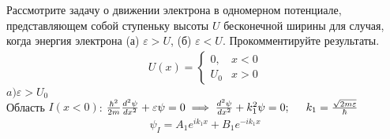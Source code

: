 \documentclass[__main__.tex]{subfiles}
\begin{document}
Рассмотрите задачу о движении электрона в одномерном потенциале, представляющем собой ступеньку высоты $U$ бесконечной ширины для случая, когда энергия электрона (а) $\varepsilon>U$, (б) $\varepsilon<U$. Прокомментируйте результаты.\\ 
\begin{gather*}
U(x) = 
\begin{cases}
	0, & x < 0\\
	U_0 & x > 0
\end{cases}
\end{gather*}
$a) \varepsilon > U_0$\\
Область $I(x < 0)$:\hspace{0.5cm} $\frac{\hbar^2}{2m}\frac{d^2\psi}{dx^2}+\varepsilon\psi = 0 \implies \frac{d^2\psi}{dx^2} + k_1^2\psi = 0; \hspace{0.5cm} k_1 = \frac{\sqrt{2m\varepsilon}}{\hbar}$
\begin{gather*}
	\psi_I = A_1e^{ik_1x} + B_1e^{-ik_1x}
\end{gather*}
\end{document}
